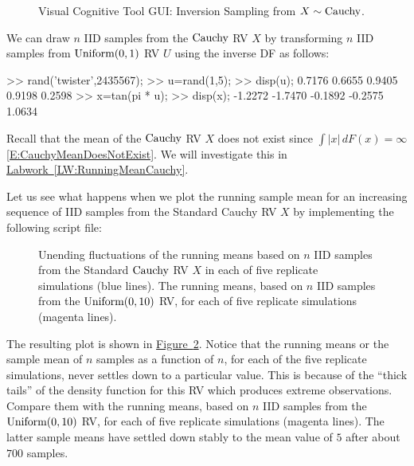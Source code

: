 \begin{figure}[htpb]
\caption{Visual Cognitive Tool GUI: Inversion Sampling from $X \sim \mbox{{\rm Cauchy}}$.\label{F:guiInversionSamplerCauchy}}
\centering   {}
\end{figure}

\begin{simulation}[$\cauchy$]\label{SIM:StdCauchy}
We can draw $n$ IID samples from the $\cauchy$ RV $X$ by transforming $n$ IID samples from $\mbox{{\rm Uniform}}(0,1)$ RV $U$ using the inverse DF as follows:
\begin{VrbM}
>> rand('twister',2435567);        %
>> u=rand(1,5);			%
>> disp(u);			%
    0.7176    0.6655    0.9405    0.9198    0.2598
>> x=tan(pi * u);     %
>> disp(x);  %
   -1.2272   -1.7470   -0.1892   -0.2575    1.0634
\end{VrbM}
\end{simulation}
 Recall that the mean of the $\cauchy$ RV $X$ does not exist since $\int \left|x\right|\,dF(x) = \infty$ \eqref{E:CauchyMeanDoesNotExist}.  We will investigate this in \hyperref[LW:RunningMeanCauchy]{Labwork~\ref*{LW:RunningMeanCauchy}}.

 \begin{labwork}\label{LW:RunningMeanCauchy}
Let us see what happens when we plot the running sample mean for an increasing sequence of IID samples from the Standard Cauchy RV $X$ by implementing the following script file:


\begin{figure}[htpb]
\caption{Unending fluctuations of  the running means based on $n$ IID samples from the Standard $\cauchy$ RV $X$ in each of five replicate simulations (blue lines).  The running means, based on $n$ IID samples from the $\mbox{{\rm Uniform}}(0,10)$ RV, for each of five replicate simulations (magenta lines). \label{F:plot5RunningMeansStandardcauchyUnif010}}
\centering   {}
\end{figure}

The resulting plot is shown in \hyperref[F:plot5RunningMeansStandardcauchyUnif010]{Figure~\ref*{F:plot5RunningMeansStandardcauchyUnif010}}.  Notice that the running means or the sample mean of $n$ samples as  a function of $n$, for each of the five replicate simulations, never settles down to a particular value.  This is because of the ``thick tails'' of the density function for this RV which produces extreme observations.  Compare them with the running means, based on $n$ IID samples from the $\mbox{{\rm Uniform}}(0,10)$ RV, for each of five replicate simulations (magenta lines).  The latter sample means have settled down stably to the mean value of $5$ after about $700$ samples.
\end{labwork}

